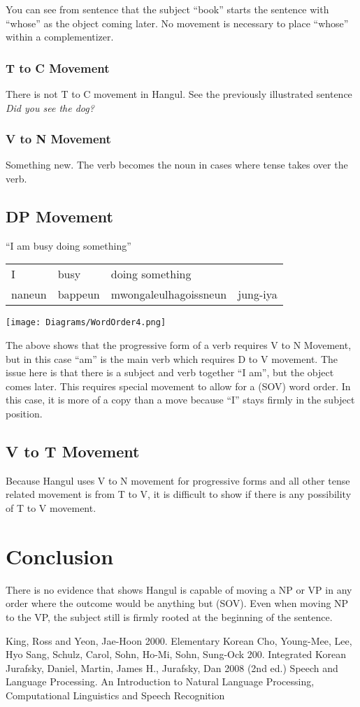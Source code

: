 \documentclass[11pt]{report}
\begin{document}
You can see from sentence that the subject ``book'' starts the
sentence with ``whose'' as the object coming later. No movement is
necessary to place ``whose'' within a complementizer.

\subsubsection{T to C Movement}
There is not T to C movement in Hangul. See the previously illustrated sentence
\emph{Did you see the dog?}

\subsubsection{V to N Movement}
Something new. The verb becomes the noun in cases where tense takes
over the verb.

\subsection{DP Movement}
``I am busy doing something''

\begin{tabular}{llll}
I & busy & doing something &  \\
naneun & bappeun& mwongaleulhagoissneun& jung-iya
\end{tabular}

\texttt{[image: Diagrams/WordOrder4.png]}

The above shows that the progressive form of a verb requires V to N
Movement, but in this case ``am'' is the main verb which requires D to
V movement. The issue here is that there is a subject and verb
together ``I am'', but the object comes later. This requires special
movement to allow for a (SOV) word order. In this case, it is more of
a copy than a move because ``I'' stays firmly in the subject position.

\subsection{V to T Movement}
Because Hangul uses V to N movement for progressive forms and all
other tense related movement is from T to V, it is difficult to show
if there is any possibility of T to V movement.


\section{Conclusion}
There is no evidence that shows Hangul is capable of moving a NP or VP
in any order where the outcome would be anything but (SOV). Even when
moving NP to the VP, the subject still is firmly rooted at the
beginning of the sentence.


\begin{thebibliography}{9}
   King, Ross and Yeon, Jae-Hoon 2000. Elementary Korean
   Cho, Young-Mee, Lee, Hyo Sang, Schulz, Carol,
    Sohn, Ho-Mi, Sohn, Sung-Ock 200. Integrated Korean
   Jurafsky, Daniel, Martin, James H., Jurafsky, Dan
    2008 (2nd ed.) Speech and Language Processing. An Introduction to Natural Language Processing, Computational Linguistics and Speech Recognition
\end{thebibliography}
\end{document}
